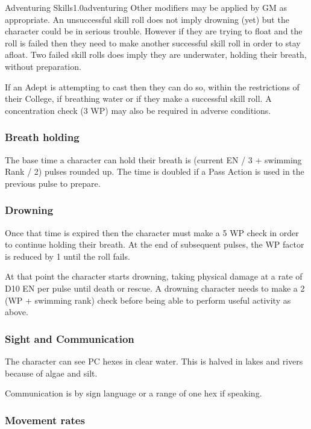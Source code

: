 \begin{skill}{Adventuring Skills}{1.0}{adventuring}
Other modifiers may be applied by GM as appropriate.  An unsuccessful
skill roll does not imply drowning (yet) but the character could be in
serious trouble. However if they are trying to float and the roll is
failed then they need to make another successful skill roll in order
to stay afloat.  Two failed skill rolls does imply they are
underwater, holding their breath, without preparation.

If an Adept is attempting to cast then they can do so, within the
restrictions of their College, if breathing water or if they make a
successful skill roll. A concentration check (3 \x WP) may also be
required in adverse conditions.

\subsubsection{Breath holding}

The base time a character can hold their breath is (current EN / 3 +
swimming Rank / 2) pulses rounded up. The time is doubled if a Pass
Action is used in the previous pulse to prepare.

\subsubsection{Drowning}

Once that time is expired then the character must make a 5 \x WP check
in order to continue holding their breath. At the end of subsequent
pulses, the WP factor is reduced by 1 until the roll fails.

At that point the character starts drowning, taking physical damage at
a rate of D10 EN per pulse until death or rescue. A drowning character
needs to make a 2 \x (WP + swimming rank) check before being able to
perform useful activity as above.

\subsubsection{Sight and Communication}

The character can see PC hexes in clear water. This is halved in lakes
and rivers because of algae and silt.

Communication is by sign language or a range of one hex if speaking.

\subsubsection{Movement rates}


\end{skill}
